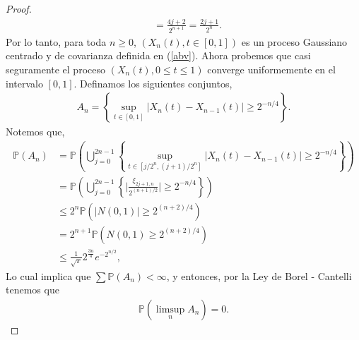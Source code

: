 \begin{proof}
\begin{align*}
	& = \frac{4j + 2}{2^{n+1}} = \frac{2j + 1}{2^n}.
	\end{align*}
Por lo tanto, para toda $n \geq 0$, $(X_n (t), t \in [0, 1])$ es un proceso Gaussiano centrado y de covarianza definida en (\ref{abv}). Ahora probemos que casi seguramente el proceso $(X_n (t), 0 \leq t \leq 1)$ converge uniformemente en el intervalo $[0, 1]$. Definamos los siguientes conjuntos, 
	\begin{align*}
		A_n = \left\{ \sup_{t \in [0, 1]} |X_n (t) - X_{n-1} (t)| \geq 2^{-n / 4} \right\}.
	\end{align*}
Notemos que, 
	\begin{align*}
		\mathbb{P}(A_n) & = \mathbb{P} \left( \bigcup_{j = 0}^{2n - 1} \left\{ \sup_{t \in [j/2^n, (j+1)/2^n]} |X_n (t) - X_{n-1} (t)| \geq 2^{-n / 4} \right\} \right) \\
		& = \mathbb{P} \left( \bigcup_{j = 0}^{2n - 1} \left\{ \bigg| \frac{\xi_{2j+1, n}}{2^{(n+1)/2}} \bigg| \geq 2^{-n / 4} \right\} \right) \\
		& \leq 2^n \mathbb{P}\left( |N(0, 1)| \geq 2^{(n+2)/4} \right) \\
		& = 2^{n+1} \mathbb{P}\left( N(0, 1) \geq 2^{(n+2)/4} \right) \\
		& \leq \frac{1}{\sqrt{\pi}} 2^{\frac{3n}{4}} e^{-2^{n/2}},
	\end{align*}
Lo cual implica que $\sum \mathbb{P}(A_n) < \infty$, y entonces, por la Ley de Borel - Cantelli tenemos que 
\begin{align*}
\mathbb{P} \left( \limsup_n A_n \right) = 0.
\end{align*}


\end{proof}
